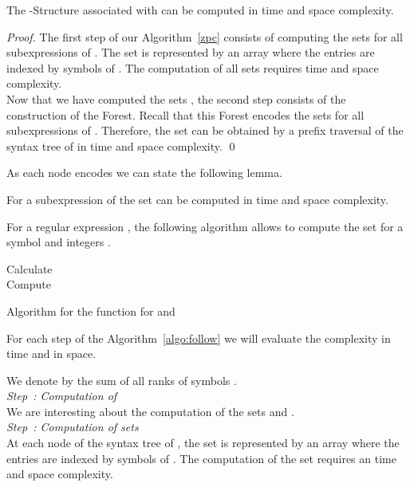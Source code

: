 \documentclass{llncs}
\begin{document}
\begin{theorem}\label{theorem-zpc}
 The -Structure associated with  can be computed in  time and space complexity.
\end{theorem}
\begin{proof}
The first step of our Algorithm~\ref{zpc} consists of computing the sets  for all subexpressions  of . 
The set  is represented by an array where the entries are indexed by symbols of . 
The computation of all sets  requires  time and space complexity.\\  

Now that we have computed the sets , the second step consists of the construction of the  Forest. 
Recall that this  Forest encodes the  sets for all subexpressions  of . 
 Therefore, the set  can be obtained by a prefix traversal of the syntax tree of  in  time and space complexity.
\qed
\end{proof}
As each node  encodes  we can state the following lemma.
\begin{lemma}\label{l1}
For a subexpression  of  the set  can be computed in  time and space complexity.
\end{lemma}


For a regular expression , the following algorithm allows to compute the set  for a symbol  and integers .\\

\begin{algorithm}[H]
  \nl Calculate~{}\\
       Compute~\;
      \Return{}
  \caption{Algorithm for the function  for  and }
  \label{algo:follow}
\end{algorithm}

For each step of the Algorithm~\ref{algo:follow} we will evaluate the complexity in time and in space.


We denote by  the sum of all ranks of symbols 
.\\ 

\noindent\emph{Step~: Computation of }\\
We are interesting about the computation of the sets  and . \\ 


\noindent\emph{Step~: Computation of sets }\\

At each node  of the syntax tree  of , the set  is represented by an array where the entries are indexed by symbols of .
 The computation of the set  requires an  time and space complexity.\\  
\end{document}
